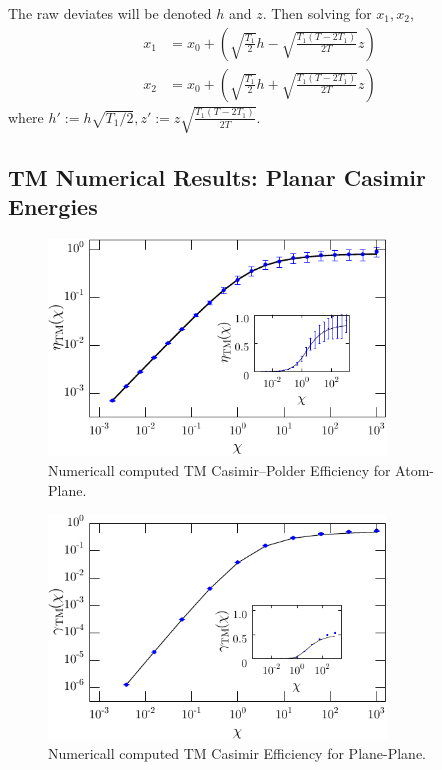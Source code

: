The raw deviates will be denoted $h$ and $z$.%
Then solving for $x_1, x_2$, 
\begin{align}
  x_1 & = x_0 + \left(\sqrt{\frac{T_1}{2}}h-\sqrt{\frac{T_1(T-2T_1)}{2T}}z\right)\\
  x_2 & = x_0 + \left(\sqrt{\frac{T_1}{2}}h+\sqrt{\frac{T_1(T-2T_1)}{2T}}z\right)
\end{align}
where $h' := h\sqrt{T_1/2}, z' := z\sqrt{\frac{T_1(T-2T_1)}{2T}}$.






\subsection{TM Numerical Results: Planar Casimir Energies}


\begin{figure}
\centering
  \includegraphics[width=0.8\textwidth]{fig/temp/eff_TM_atom_wall}
  \caption{Numericall computed TM Casimir--Polder Efficiency for Atom-Plane.  }
\end{figure}

\begin{figure}
\centering
  \includegraphics[width=0.8\textwidth]{fig/temp/eff_TM_2wall}
  \caption{Numericall computed TM Casimir Efficiency for Plane-Plane.  }
\end{figure}


